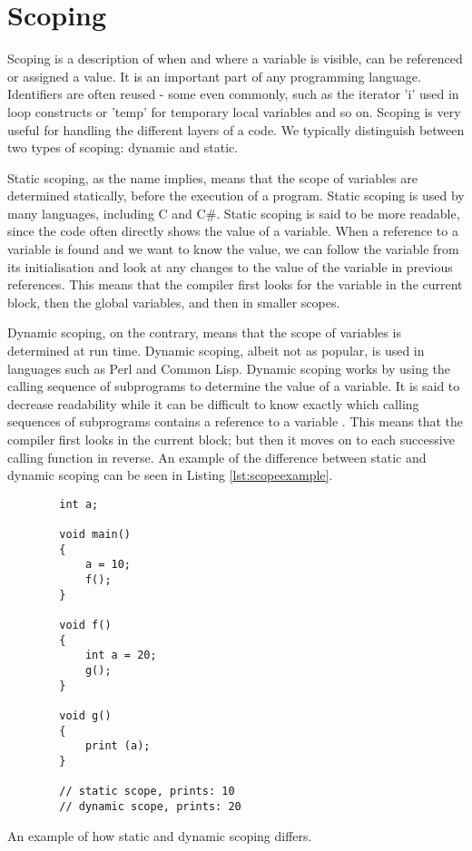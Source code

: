 \section{Scoping}\label{sec:scoping}

Scoping is a description of when and where a variable is visible, can be referenced or assigned a value. It is an important part of any programming language. Identifiers are often reused - some even commonly, such as the iterator 'i' used in loop constructs or 'temp' for temporary local variables and so on. Scoping is very useful for handling the different layers of a code. We typically distinguish between two types of scoping: dynamic and static.

Static scoping, as the name implies, means that the scope of variables are determined statically, before the execution of a program. Static scoping is used by many languages, including C and C\#. Static scoping is said to be more readable, since the code often directly shows the value of a variable. When a reference to a variable is found and we want to know the value, we can follow the variable from its initialisation and look at any changes to the value of the variable in previous references. This means that the compiler first looks for the variable in the current block, then the global variables, and then in smaller scopes.

Dynamic scoping, on the contrary, means that the scope of variables is determined at run time. Dynamic scoping, albeit not as popular, is used in languages such as Perl and Common Lisp. Dynamic scoping works by using the calling sequence of subprograms to determine the value of a variable. It is said to decrease readability while it can be difficult to know exactly which calling sequences of subprograms contains a reference to a variable \cite{Sebesta2016}. This means that the compiler first looks in the current block; but then it moves on to each successive calling function in reverse. An example of the difference between static and dynamic scoping can be seen in Listing \ref{lst:scopeexample}.

\begin{listing}[htb!]
    \begin{verbatim}
        int a;

        void main()
        {
            a = 10;
            f();
        }

        void f()
        {
            int a = 20;
            g();
        }

        void g()
        {
            print (a);
        }

        // static scope, prints: 10
        // dynamic scope, prints: 20
    \end{verbatim}
    \caption{An example of how static and dynamic scoping differs.}
    \label{lst:scopeexample}
\end{listing}

